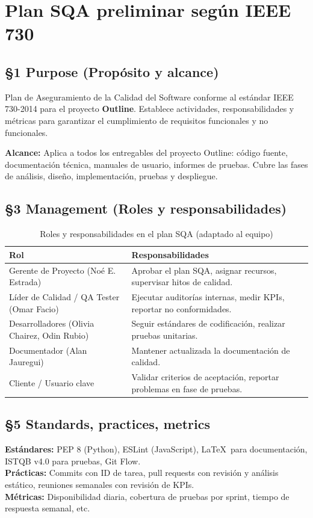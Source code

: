 \documentclass[12pt]{article}
\begin{document}
\section{Plan SQA preliminar según IEEE 730}

\subsection{§1 Purpose (Propósito y alcance)}
Plan de Aseguramiento de la Calidad del Software conforme al estándar IEEE 730-2014 \cite{ieee730} para el proyecto \textbf{Outline}. Establece actividades, responsabilidades y métricas para garantizar el cumplimiento de requisitos funcionales y no funcionales.

\textbf{Alcance:} Aplica a todos los entregables del proyecto Outline: código fuente, documentación técnica, manuales de usuario, informes de pruebas. Cubre las fases de análisis, diseño, implementación, pruebas y despliegue.

\subsection{§3 Management (Roles y responsabilidades)}
\begin{table}[H]
\centering
\caption{Roles y responsabilidades en el plan SQA (adaptado al equipo)}
\begin{tabular}{|l|p{8cm}|}
\hline
\textbf{Rol} & \textbf{Responsabilidades} \\ \hline
Gerente de Proyecto (Noé E. Estrada) & Aprobar el plan SQA, asignar recursos, supervisar hitos de calidad. \\ \hline
Líder de Calidad / QA Tester (Omar Facio) & Ejecutar auditorías internas, medir KPIs, reportar no conformidades. \\ \hline
Desarrolladores (Olivia Chairez, Odin Rubio) & Seguir estándares de codificación, realizar pruebas unitarias. \\ \hline
Documentador (Alan Jauregui) & Mantener actualizada la documentación de calidad. \\ \hline
Cliente / Usuario clave & Validar criterios de aceptación, reportar problemas en fase de pruebas. \\ \hline
\end{tabular}
\end{table}

\subsection{§5 Standards, practices, metrics}
\textbf{Estándares:} PEP 8 (Python), ESLint (JavaScript), \LaTeX\ para documentación, ISTQB v4.0 para pruebas, Git Flow. \\
\textbf{Prácticas:} Commits con ID de tarea, pull requests con revisión y análisis estático, reuniones semanales con revisión de KPIs. \\
\textbf{Métricas:} Disponibilidad diaria, cobertura de pruebas por sprint, tiempo de respuesta semanal, etc.
\end{document}
